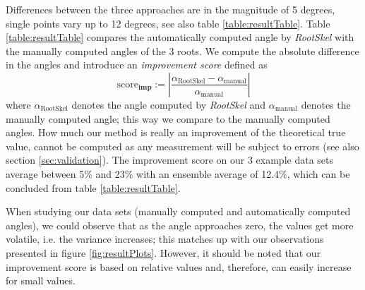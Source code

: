 Differences between the three approaches are in the magnitude of 5 degrees, single points vary up to 12 degrees, see also table \ref{table:resultTable}.
Table \ref{table:resultTable} compares the automatically computed angle by \textit{RootSkel} with the manually computed angles of the 3 roots. We compute the absolute difference in the angles and introduce an \textit{improvement score} defined as 
\[
 \text{score}_{\textbf{imp}} := | \frac{ \alpha_{\text{RootSkel}} - \alpha_{\text{manual}} }{\alpha_{\text{manual}}} |
\]
where $\alpha_{\text{RootSkel}}$ denotes the angle computed by \textit{RootSkel} and $\alpha_{\text{manual}}$ denotes the manually computed angle; this way we compare to the manually computed angles. How much our method is really an improvement of the theoretical true value, cannot be computed as any measurement will be subject to errors (see also section \ref{sec:validation}). The improvement score on our 3 example data sets average between 5\% and 23\% with an ensemble average of 12.4\%, which can be concluded from table \ref{table:resultTable}.

When studying our data sets (manually computed and automatically computed angles), we could observe that as the angle approaches zero, the values get more volatile, i.e. the variance increases; this matches up with our observations presented in figure \ref{fig:resultPlots}. However, it should be noted that our improvement score is based on relative values and, therefore, can easily increase for small values. %


